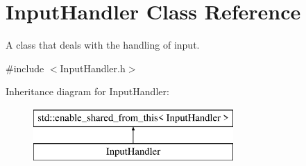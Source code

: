 \hypertarget{class_input_handler}{}\section{Input\+Handler Class Reference}
\label{class_input_handler}


A class that deals with the handling of input.  




{\ttfamily \#include $<$Input\+Handler.\+h$>$}

Inheritance diagram for Input\+Handler\+:\begin{figure}[H]
\begin{center}
\leavevmode
\includegraphics[height=2.000000cm]{class_input_handler}
\end{center}
\end{figure}
